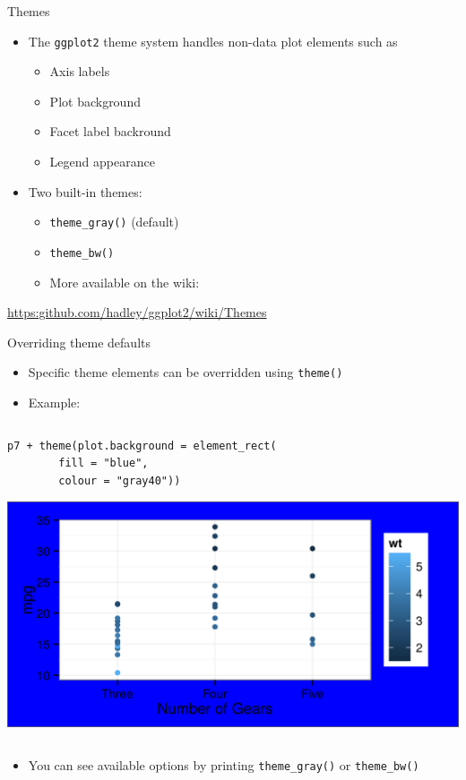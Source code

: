 \documentclass[table,smaller]{beamer}
\begin{document}
\begin{frame}[fragile,label=sec-6-1]{Themes}
 \begin{itemize}
\item The \verb~ggplot2~ theme system handles non-data plot elements such as
\begin{itemize}
\item Axis labels
\item Plot background
\item Facet label backround
\item Legend appearance
\end{itemize}
\item Two built-in themes:
\begin{itemize}
\item \verb~theme_gray()~ (default)
\item \verb~theme_bw()~
\item More available on the wiki:
\end{itemize}
\end{itemize}
\url{https:github.com/hadley/ggplot2/wiki/Themes}
\end{frame}

\begin{frame}[fragile,label=sec-6-2]{Overriding theme defaults}
 \begin{itemize}
\item Specific theme elements can be overridden using \verb~theme()~
\item Example:
\end{itemize}

\begin{columns}  \begin{block}{}

\begin{verbatim}
p7 + theme(plot.background = element_rect(
	    fill = "blue",
	    colour = "gray40"))
\end{verbatim}

\includegraphics[width=.9\linewidth]{images/opts.png}

\end{block} \end{columns}
\begin{itemize}
\item You can see available options by printing \verb~theme_gray()~ or \verb~theme_bw()~
\end{itemize}
\end{frame}
\end{document}

